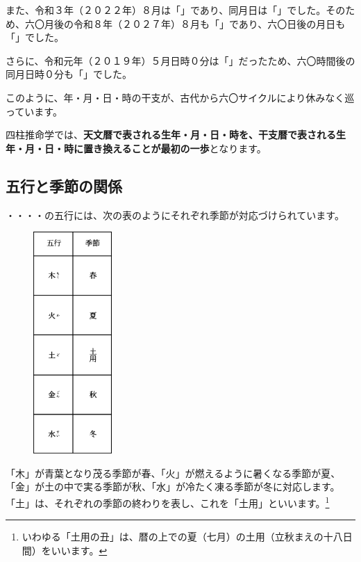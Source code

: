 \documentclass[a5paper,11pt,dvipdfmx]{tarticle}
\begin{document}
また、令和３年（２０２２年）８月は「」であり、同月日は「」でした。そのため、六〇月後の令和８年（２０２７年）８月も「」であり、六〇日後の月日も「」でした。

さらに、令和元年（２０１９年）５月日時０分は「」だったため、六〇時間後の同月日時０分も「」でした。

このように、年・月・日・時の干支が、古代から六〇サイクルにより休みなく巡っています。

四柱推命学では、\textbf{天文暦で表される生年・月・日・時を、干支暦で表される生年・月・日・時に置き換えることが最初の一歩}となります。


\subsection{五行と季節の関係}

・・・・の五行には、次の表のようにそれぞれ季節が対応づけられています。

\begin{figure}[h]
  \centering
  \includegraphics[width=30mm,angle=90]{figs/table2-4.eps}
\end{figure}

「木」が青葉となり茂る季節が春、「火」が燃えるように暑くなる季節が夏、「金」が土の中で実る季節が秋、「水」が冷たく凍る季節が冬に対応します。「土」は、それぞれの季節の終わりを表し、これを「土用」といいます。\footnote{いわゆる「土用の丑」は、暦の上での夏（七月）の土用（立秋まえの十八日間）をいいます。}
\end{document}
